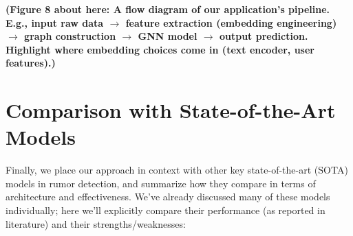 \documentclass[12pt,a4paper]{report}
\begin{document}
\textbf{(Figure 8 about here: A flow diagram of our application’s pipeline. E.g., input raw data \(\rightarrow\) feature extraction (embedding engineering) \(\rightarrow\) graph construction \(\rightarrow\) GNN model \(\rightarrow\) output prediction. Highlight where embedding choices come in (text encoder, user features).)}

\chapter{Comparison with State-of-the-Art Models}

Finally, we place our approach in context with other key state-of-the-art (SOTA) models in rumor detection, and summarize how they compare in terms of architecture and effectiveness. We’ve already discussed many of these models individually; here we’ll explicitly compare their performance (as reported in literature) and their strengths/weaknesses:
\end{document}

